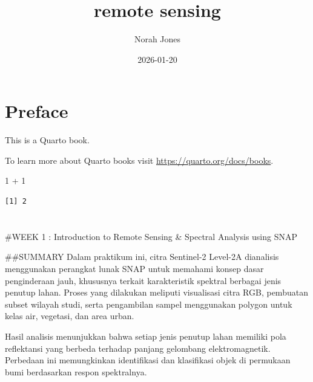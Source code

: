 \documentclass[
  letterpaper,
  DIV=11,
  numbers=noendperiod]{scrreprt}
\title{remote sensing}
\author{Norah Jones}
\date{2026-01-20}
\newenvironment{Shaded}{\begin{snugshade}}{\end{snugshade}}
\newcommand{\DecValTok}[1]{\textcolor[rgb]{0.68,0.00,0.00}{#1}}
\newcommand{\SpecialCharTok}[1]{\textcolor[rgb]{0.37,0.37,0.37}{#1}}
\renewcommand*\contentsname{Table of contents}
\newcommand\contentsname{Table of contents}
\begin{document}
\maketitle

\renewcommand*\contentsname{Table of contents}
{
\hypersetup{linkcolor=}
\setcounter{tocdepth}{2}
\tableofcontents
}


\chapter*{Preface}\label{preface}


This is a Quarto book.

To learn more about Quarto books visit
\url{https://quarto.org/docs/books}.

\begin{Shaded}
\begin{Highlighting}[]
\DecValTok{1} \SpecialCharTok{+} \DecValTok{1}
\end{Highlighting}
\end{Shaded}

\begin{verbatim}
[1] 2
\end{verbatim}


\chapter{}\label{section}

\#WEEK 1 : Introduction to Remote Sensing \& Spectral Analysis using
SNAP

\#\#SUMMARY Dalam praktikum ini, citra Sentinel-2 Level-2A dianalisis
menggunakan perangkat lunak SNAP untuk memahami konsep dasar
penginderaan jauh, khususnya terkait karakteristik spektral berbagai
jenis penutup lahan. Proses yang dilakukan meliputi visualisasi citra
RGB, pembuatan subset wilayah studi, serta pengambilan sampel
menggunakan polygon untuk kelas air, vegetasi, dan area urban.

Hasil analisis menunjukkan bahwa setiap jenis penutup lahan memiliki
pola reflektansi yang berbeda terhadap panjang gelombang
elektromagnetik. Perbedaan ini memungkinkan identifikasi dan klasifikasi
objek di permukaan bumi berdasarkan respon spektralnya.
\end{document}
